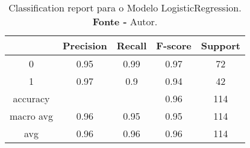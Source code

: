 % 
\begin{table}[H]
    \centering
    \begin{tabular}{@{}ccccc@{}}
    \toprule
     & \textbf{Precision} & \textbf{Recall} &\textbf{F-score} & \textbf{Support} \\ \midrule 
    0 & 0.95 & 0.99 & 0.97 & 72 \\ 
    1 & 0.97 & 0.9 & 0.94 & 42 \\ 
    accuracy &  &  & 0.96 & 114 \\ 
    macro avg & 0.96 & 0.95 & 0.95 & 114 \\ 
    avg & 0.96 & 0.96 & 0.96 & 114 \\ \bottomrule 
    \end{tabular}
    \caption{Classification report para o Modelo LogisticRegression. \\ \textbf{Fonte -} Autor.}
    \label{tab: classification-report-Modelo LogisticRegression}
\end{table}
